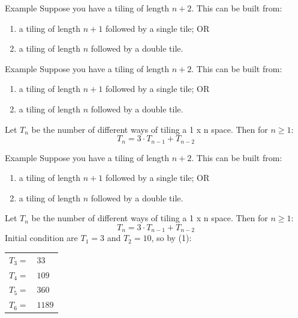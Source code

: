 \documentclass{beamer}
\begin{document}
\begin{frame}{Example}
    Suppose you have a tiling of length $n+2$. This can be built from:
    \begin{enumerate}
        \item a tiling of length $n+1$ followed by a single tile; OR
        \item a tiling of length $n$ followed by a double tile.
    \end{enumerate}
\end{frame}

\begin{frame}{Example}
    Suppose you have a tiling of length $n+2$. This can be built from:
    \begin{enumerate}
        \item a tiling of length $n+1$ followed by a single tile; OR
        \item a tiling of length $n$ followed by a double tile.
    \end{enumerate}
    Let $T_n$ be the number of different ways of tiling a 1 x n space. Then for $n \geq 1$:
    \begin{equation}\tag{1}
        T_n = 3 \cdot T_{n-1} + T_{n-2}
    \end{equation}
\end{frame}

\begin{frame}{Example}
    Suppose you have a tiling of length $n+2$. This can be built from:
    \begin{enumerate}
        \item a tiling of length $n+1$ followed by a single tile; OR
        \item a tiling of length $n$ followed by a double tile.
    \end{enumerate}
    Let $T_n$ be the number of different ways of tiling a 1 x n space. Then for $n \geq 1$:
    \begin{equation}\tag{1}
        T_n = 3 \cdot T_{n-1} + T_{n-2}
    \end{equation}
    Initial condition are  $T_1 = 3$ and  $T_2 = 10$, so by (1): \\
    \begin{tabular}{l l}
        $T_3 = $ & $ 33$ \\
        $T_4 = $ & $ 109$ \\
        $T_5 = $ & $ 360$ \\
        $T_6 = $ & $ 1189$ \\
    \end{tabular}    
\end{frame}
\end{document}
